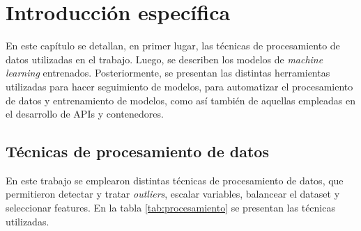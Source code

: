 \chapter{Introducción específica} %

\label{Chapter2}

En este capítulo se detallan, en primer lugar, las técnicas de procesamiento de datos utilizadas en el trabajo.
Luego, se describen los modelos de \textit{machine learning} entrenados.
Posteriormente, se presentan las distintas herramientas utilizadas para hacer seguimiento de modelos, para automatizar el procesamiento de datos y entrenamiento de modelos, como así también de aquellas empleadas en el desarrollo de APIs y contenedores.

\section{Técnicas de procesamiento de datos}
\label{subsec:tecnicas_procesamiento}

En este trabajo se emplearon distintas técnicas de procesamiento de datos, que permitieron detectar y tratar \textit{outliers}, escalar variables, balancear el dataset y seleccionar features. En la tabla \ref{tab:procesamiento} se presentan las técnicas utilizadas.

